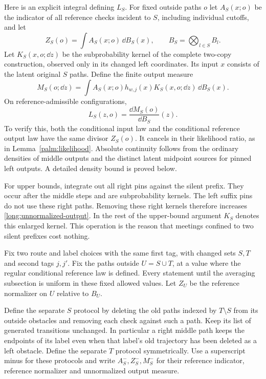 Here is an explicit integral defining $L_S$.  For fixed outside paths $o$
let $A_S(x;o)$ be the indicator of all reference checks incident to $S$,
including individual cutoffs, and let
\[
 Z_S(o)=\int A_S(x;o)\,\dd B_S(x),\qquad
 B_S=\bigotimes_{l\in S}B_l.
\]
Let $K_S(x,o;\dd z)$ be the subprobability kernel of the complete
two-copy construction, observed only in its changed left coordinates.
Its input $x$ consists of the latent original $S$ paths.  Define the
finite output measure
\begin{equation}\label{long:unnormalized-output}
 M_S(o;\dd z)=\int A_S(x;o)h_{w,j}(x)
                         K_S(x,o;\dd z)\,\dd B_S(x).
\end{equation}
On reference-admissible configurations,
\begin{equation}\label{long:exact-likelihood}
                         L_S(z,o)=\frac{\dd M_S(o)}{\dd B_S}(z).
\end{equation}
To verify this, both the conditional input law and the conditional reference
output law have the same divisor $Z_S(o)$.  It cancels in their likelihood
ratio, as in Lemma~\ref{palm:likelihood}.  Absolute continuity follows from
the ordinary densities of middle outputs and the distinct latent midpoint
sources for pinned left outputs.  A detailed density bound is proved below.

For upper bounds, integrate out all right pins against the silent prefix.
They occur after the middle steps and are subprobability kernels.  The
left suffix pins do not use these right paths.  Removing these right kernels
therefore increases \eqref{long:unnormalized-output}.  In the rest of the
upper-bound argument $K_S$ denotes this enlarged kernel.  This operation
is the reason that meetings confined to two silent prefixes cost nothing.

Fix two route and label choices with the same first tag, with changed sets
$S,T$ and second tags $j,j'$.  Fix the paths outside $U=S\cup T$, at a value
where the regular conditional reference law is defined.  Every statement
until the averaging subsection is uniform in these fixed allowed values.
Let $Z_U$ be the reference normalizer on $U$ relative to $B_U$.

Define the separate $S$ protocol by deleting the old paths indexed by
$T\setminus S$ from its outside obstacles and removing each check against
such a path.  Keep its list of generated transitions unchanged.  In
particular a right middle path keeps the endpoints of its label even when
that label's old trajectory has been deleted as a left obstacle.  Define
the separate $T$ protocol symmetrically.  Use a superscript minus for these
protocols and write $A_S^-,Z_S^-,M_S^-$ for their reference indicator,
reference normalizer and unnormalized output measure.

